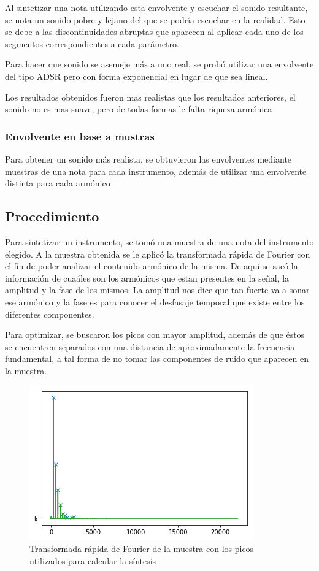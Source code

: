 \documentclass[assd_tp2_main.tex]{subfiles}
\begin{document}
Al sintetizar una nota utilizando esta envolvente y escuchar el sonido resultante, se nota un sonido pobre y lejano del que se podría escuchar en la realidad. Esto se debe a las discontinuidades abruptas que aparecen al aplicar cada uno de los segmentos correspondientes a cada parámetro.

Para hacer que sonido se asemeje más a uno real, se probó utilizar una envolvente del tipo ADSR pero con forma exponencial en lugar de que sea lineal.

Los resultados obtenidos fueron mas realistas que los resultados anteriores, el sonido no es mas suave, pero de todas formas le falta riqueza armónica

\subsubsection{Envolvente en base a mustras}

Para obtener un sonido más realista, se obtuvieron las envolventes mediante muestras de una nota para cada instrumento, además de utilizar una envolvente distinta para cada armónico


\subsection{Procedimiento}

Para sintetizar un instrumento, se tomó una muestra de una nota del instrumento elegido. A la muestra obtenida se le aplic\'o la transformada r\'apida de Fourier con el fin de poder analizar el contenido arm\'onico de la misma. De aqu\'i se sac\'o la informaci\'on de cua\'ales son los arm\'onicos que estan presentes en la señal, la amplitud y la fase de los mismos. La amplitud nos dice que tan fuerte va a sonar ese armónico y la fase es para conocer el desfasaje temporal que existe entre los diferentes componentes.

Para optimizar, se buscaron los picos con mayor amplitud, además de que éstos se encuentren separados con una distancia de aproximadamente la frecuencia fundamental, a tal forma de no tomar las componentes de ruido que aparecen en la muestra.

\begin{figure}[H]
	\centering
	\includegraphics[scale=0.75]{graficos/fft.png}
	\caption{Transformada rápida de Fourier de la muestra con los picos utilizados para calcular la síntesis}
\end{figure}
\end{document}
